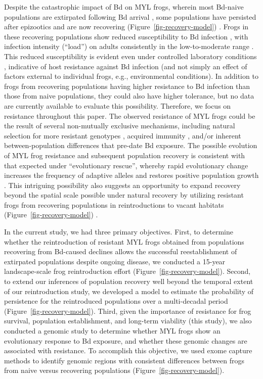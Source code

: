 \documentclass[9pt,twocolumn,twoside,lineno]{pnas-new}
\begin{document}
Despite the catastrophic impact of Bd on MYL frogs, wherein most
Bd-naive populations are extirpated following Bd arrival
\citep{vredenburg2010}, some populations have persisted after epizootics
\citep[during which Bd infection intensity on frogs is very
high,][]{briggs2010} and are now recovering
(Figure~\ref{fig-recovery-model}) \citep{knapp2016}. Frogs in these
recovering populations show reduced susceptibility to Bd infection
\citep{knapp2016}, with infection intensity (``load'') on adults
consistently in the low-to-moderate range
\citep{briggs2010, knapp2011, joseph2018}. This reduced susceptibility
is evident even under controlled laboratory conditions
\citep{knapp2016}, indicative of host resistance against Bd infection
(and not simply an effect of factors external to individual frogs, e.g.,
environmental conditions). In addition to frogs from recovering
populations having higher resistance to Bd infection than those from
naive populations, they could also have higher tolerance, but no data
are currently available to evaluate this possibility. Therefore, we
focus on resistance throughout this paper. The observed resistance of
MYL frogs could be the result of several non-mutually exclusive
mechanisms, including natural selection for more resistant genotypes
\citep{savage2016, grogan2018b}, acquired immunity \citep{grogan2018a},
and/or inherent between-population differences that pre-date Bd
exposure. The possible evolution of MYL frog resistance and subsequent
population recovery is consistent with that expected under
``evolutionary rescue'', whereby rapid evolutionary change increases the
frequency of adaptive alleles and restores positive population growth
\citep{carlson2014, searle2020}. This intriguing possibility also
suggests an opportunity to expand recovery beyond the spatial scale
possible under natural recovery by utilizing resistant frogs from
recovering populations in reintroductions to vacant habitats
(Figure~\ref{fig-recovery-model}) \citep{joseph2018, mendelson2019}.

In the current study, we had three primary objectives. First, to
determine whether the reintroduction of resistant MYL frogs obtained
from populations recovering from Bd-caused declines allows the
successful reestablishment of extirpated populations despite ongoing
disease, we conducted a 15-year landscape-scale frog reintroduction
effort (Figure~\ref{fig-recovery-model}). Second, to extend our
inferences of population recovery well beyond the temporal extent of our
reintroduction study, we developed a model to estimate the probability
of persistence for the reintroduced populations over a multi-decadal
period (Figure~\ref{fig-recovery-model}). Third, given the importance of
resistance for frog survival, population establishment, and long-term
viability (this study), we also conducted a genomic study to determine
whether MYL frogs show an evolutionary response to Bd exposure, and
whether these genomic changes are associated with resistance. To
accomplish this objective, we used exome capture methods to identify
genomic regions with consistent differences between frogs from naive
versus recovering populations (Figure~\ref{fig-recovery-model}).
\end{document}
